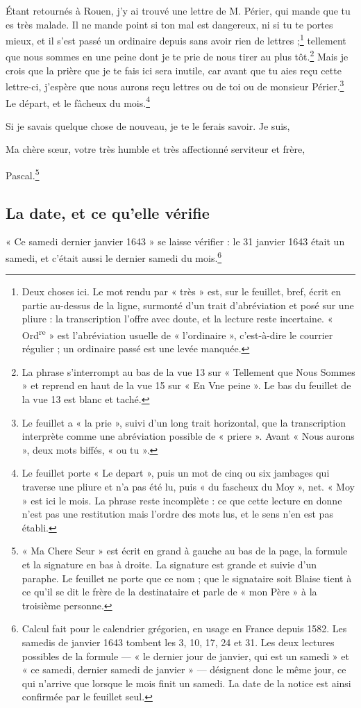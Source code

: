 \documentclass[11pt,a4paper]{article}
\begin{document}
Étant retournés à Rouen, j'y ai trouvé une lettre de M. Périer, qui mande que
tu es très malade. Il ne mande point si ton mal est dangereux, ni si tu te
portes mieux, et il s'est passé un ordinaire depuis sans avoir rien de
lettres ;\footnote{Deux choses ici. Le mot rendu par « très » est, sur le
feuillet, bref, écrit en partie au-dessus de la ligne, surmonté d'un trait
d'abréviation et posé sur une pliure : la transcription l'offre avec doute, et
la lecture reste incertaine. « Ord\textsuperscript{re} » est l'abréviation
usuelle de « l'ordinaire », c'est-à-dire le courrier régulier ; un ordinaire
passé est une levée manquée.} tellement que nous sommes en une peine dont je
te prie de nous tirer au plus tôt.\footnote{La phrase s'interrompt au bas de
la vue 13 sur « Tellement que Nous Sommes » et reprend en haut de la vue 15
sur « En Vne peine ». Le bas du feuillet de la vue 13 est blanc et taché.}
Mais je crois que la prière que je te fais ici sera inutile, car avant que tu
aies reçu cette lettre-ci, j'espère que nous aurons reçu lettres ou de toi ou
de monsieur Périer.\footnote{Le feuillet a « la prie », suivi d'un long trait
horizontal, que la transcription interprète comme une abréviation possible de
« priere ». Avant « Nous aurons », deux mots biffés, « ou tu ».} Le départ,
et le fâcheux du mois.\footnote{Le feuillet porte « Le depart », puis un mot
de cinq ou six jambages qui traverse une pliure et n'a pas été lu, puis « du
fascheux du Moy », net. « Moy » est ici le mois. La phrase reste incomplète :
ce que cette lecture en donne n'est pas une restitution mais l'ordre des mots
lus, et le sens n'en est pas établi.}

Si je savais quelque chose de nouveau, je te le ferais savoir. Je suis,

Ma chère sœur, votre très humble et très affectionné serviteur et frère,

Pascal.\footnote{« Ma Chere Seur » est écrit en grand à gauche au bas de la
page, la formule et la signature en bas à droite. La signature est grande et
suivie d'un paraphe. Le feuillet ne porte que ce nom ; que le signataire soit
Blaise tient à ce qu'il se dit le frère de la destinataire et parle de « mon
Père » à la troisième personne.}

\subsection*{La date, et ce qu'elle vérifie}

« Ce samedi dernier janvier 1643 » se laisse vérifier : le 31 janvier 1643
était un samedi, et c'était aussi le dernier samedi du mois.\footnote{Calcul
fait pour le calendrier grégorien, en usage en France depuis 1582. Les samedis
de janvier 1643 tombent les 3, 10, 17, 24 et 31. Les deux lectures possibles
de la formule — « le dernier jour de janvier, qui est un samedi » et « ce
samedi, dernier samedi de janvier » — désignent donc le même jour, ce qui
n'arrive que lorsque le mois finit un samedi. La date de la notice est ainsi
confirmée par le feuillet seul.}
\end{document}
